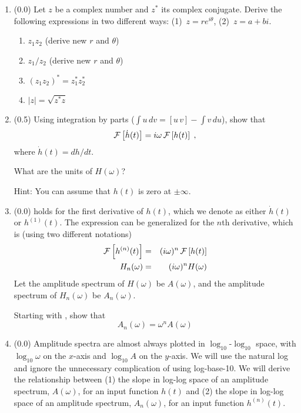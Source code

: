 \documentclass[11pt,titlepage,fleqn]{article}
\newcommand{\fft}{h}
\newcommand{\ffw}{H}
\begin{document}
\begin{enumerate}

\item (0.0) Let $z$ be a complex number and $z^*$ its complex conjugate. Derive the following expressions in two different ways: (1)~$z = r e^{i\theta}$, (2)~$z = a+bi$.
%
\begin{enumerate}
\item $z_1 z_2$ (derive new $r$ and $\theta$)
\item $z_1 / z_2$ (derive new $r$ and $\theta$)
\item $(z_1 z_2)^* = z_1^* z_2^*$
\item $|z| = \sqrt{z^* z}$
\end{enumerate}


\item (0.5) Using integration by parts ($\int u\,dv = [u\,v] - \int v\,du$), show that 
%
\begin{eqnarray}
\cF \left[ \dot{\fft}(t) \right] = i\omega \, \cF \left[ \fft(t) \right]
\label{fftder1}
\;,
\end{eqnarray}
%
where $\dot{\fft}(t) = d\fft/dt$.

What are the units of $\ffw(\omega)$?

Hint: You can assume that $h(t)$ is zero at $\pm\infty$.


\item (0.0)  holds for the first derivative of $\fft(t)$, which we denote as either $\dot{\fft}(t)$ or $\fft^{(1)}(t)$. The expression can be generalized for the $n$th derivative, which is (using two different notations)
%
\begin{eqnarray}
\cF \left[ \fft^{(n)}(t) \right] &=& (i\omega)^n \, \cF \left[ \fft(t) \right]
\\
\ffw_n(\omega) &=& (i\omega)^n \ffw(\omega)
\label{fftnder}
\end{eqnarray}
%
Let the amplitude spectrum of $\ffw(\omega)$ be $A(\omega)$, and the amplitude spectrum of $\ffw_n(\omega)$ be $A_n(\omega)$.

Starting with , show that
%
\begin{equation}
A_n(\omega) = \omega^n A(\omega)
\end{equation}


\item (0.0) Amplitude spectra are almost always plotted in $\log_{10}$-$\log_{10}$ space, with $\log_{10}\omega$ on the $x$-axis and $\log_{10}A$ on the $y$-axis. We will use the natural log and ignore the unnecessary complication of using log-base-10. We will derive the relationship between (1) the slope in log-log space of an amplitude spectrum, $A(\omega)$, for an input function $\fft(t)$ and (2)  the slope in log-log space of an amplitude spectrum, $A_n(\omega)$, for an input function $h^{(n)}(t)$.


\end{enumerate}
\end{document}

